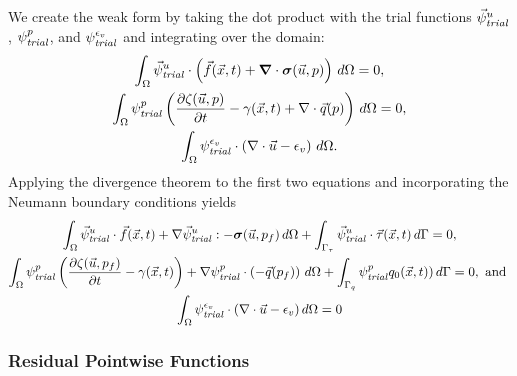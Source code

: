 %
We create the weak form by taking the dot product with the trial
functions $\trialvec[u]$, $\trialscalar[p]$, and
$\trialscalar[\epsilon_{v}]$ and
integrating over the domain:
\begin{gather}
\int_\Omega \trialvec[u] \cdot \left( \vec{f}(\vec{x},t) + \tensor{\nabla} \cdot \tensor{\sigma} (\vec{u},p) \right) \, d\Omega = 0, \\
\int_\Omega  \trialscalar[p] \left( \frac{\partial \zeta(\vec{u},p)}{\partial t} - \gamma(\vec{x},t) + \nabla \cdot \vec{q}(p)\right) \, d\Omega = 0,\\
\int_{\Omega} \trialscalar[\epsilon_{v}]\cdot \left( \nabla \cdot \vec{u} - \epsilon_v \right) \, d\Omega.
\end{gather}
%
Applying the divergence theorem to the first two equations and
incorporating the Neumann boundary conditions yields
\begin{gather}
\int_\Omega \trialvec[u] \cdot \vec{f}(\vec{x},t) + \nabla \trialvec[u] : -\tensor{\sigma}(\vec{u},p_f) \,
d\Omega + \int_{\Gamma_\tau} \trialvec[u] \cdot \vec{\tau}(\vec{x},t) \, d\Gamma = 0, \\
\int_\Omega  \trialscalar[p] \left( \frac{\partial \zeta(\vec{u},p_f)}{\partial t} - \gamma(\vec{x},t)\right)
+ \nabla \trialscalar[p] \cdot \left(-\vec{q}(p_f)\right) \, d\Omega + \int_{\Gamma_q} \trialscalar[p] q_0(\vec{x},t))\, d\Gamma = 0, \text{ and } \\
\int_{\Omega} \trialscalar[\epsilon_{v}] \cdot \left(\nabla \cdot \vec{u} - \epsilon_{v} \right) d\Omega = 0
\end{gather}

\subsubsection{Residual Pointwise Functions}

